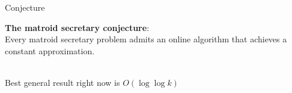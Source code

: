 \begin{frame}{Conjecture}
\begin{center}
\begin{large}
\textbf{The matroid secretary conjecture}:\\ 
Every matroid secretary problem admits an online algorithm that achieves a constant approximation.\cite{msp}
\end{large}\\
{\small Best general result right now is $O(\log \log k)$}
\end{center}

\end{frame}
